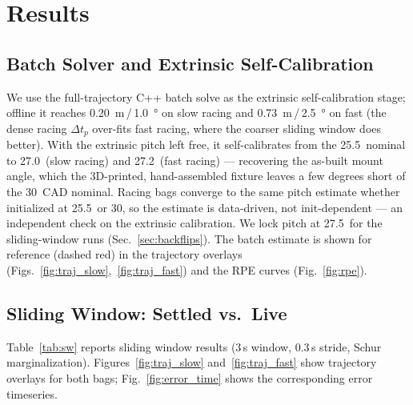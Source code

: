 \documentclass[conference]{IEEEtran}
\begin{document}
\section{Results}
\label{sec:results}

\subsection{Batch Solver and Extrinsic Self-Calibration}
We use the full-trajectory C++ batch solve as the extrinsic
self-calibration stage; offline it reaches
\SI{0.20}{\metre}\,/\,\SI{1.0}{\degree} on slow racing and
\SI{0.73}{\metre}\,/\,\SI{2.5}{\degree} on fast (the dense racing
$\Delta t_p$ over-fits fast racing, where the coarser sliding window
does better).
With the extrinsic pitch left free, it self-calibrates from the
25.5\degree\ nominal to 27.0\degree\ (slow racing) and 27.2\degree\
(fast racing) --- recovering the as-built mount angle, which the
3D-printed, hand-assembled fixture leaves a few degrees short of the
30\degree\ CAD nominal.  Racing bags converge to the same pitch estimate
whether initialized at 25.5\degree\ or 30\degree, so the estimate is
data-driven, not init-dependent --- an independent check on the
extrinsic calibration.  We lock pitch at 27.5\degree\ for the
sliding-window runs (Sec.~\ref{sec:backflips}).  The batch estimate is
shown for reference (dashed red) in the trajectory overlays
(Figs.~\ref{fig:traj_slow},~\ref{fig:traj_fast}) and the RPE curves
(Fig.~\ref{fig:rpe}).

\subsection{Sliding Window: Settled vs.\ Live}
\label{sec:sw_results}

Table~\ref{tab:sw} reports sliding window results
(3\,s window, 0.3\,s stride, Schur marginalization).
Figures~\ref{fig:traj_slow} and~\ref{fig:traj_fast} show
trajectory overlays for both bags; Fig.~\ref{fig:error_time} shows
the corresponding error timeseries.
\end{document}
